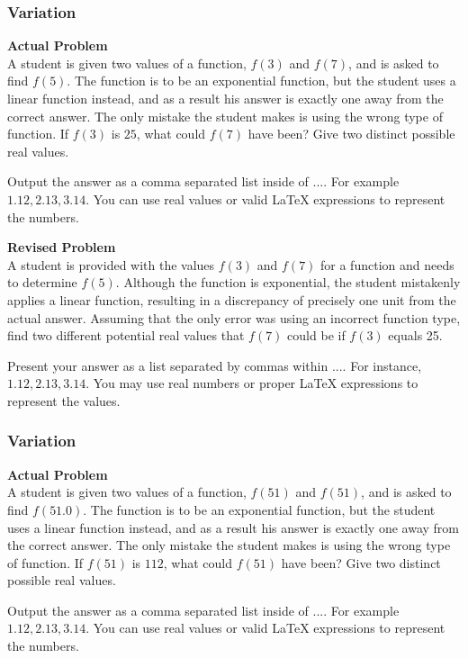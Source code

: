 \subsubsection{Variation}
\textbf{Actual Problem}\\
A student is given two values of a function, $f(3)$ and $f(7)$, and is asked to find $f(5)$. The function is to be an exponential function, but the student uses a linear function instead, and as a result his answer is exactly one away from the correct answer. The only mistake the student makes is using the wrong type of function. If $f(3)$ is $25$, what could $f(7)$ have been? Give two distinct possible real values.

Output the answer as a comma separated list inside of $\boxed{...}$. For example $\boxed{1.12, 2.13, 3.14}$. You can use real values or valid LaTeX expressions to represent the numbers.

\textbf{Revised Problem}\\
A student is provided with the values \( f(3) \) and \( f(7) \) for a function and needs to determine \( f(5) \). Although the function is exponential, the student mistakenly applies a linear function, resulting in a discrepancy of precisely one unit from the actual answer. Assuming that the only error was using an incorrect function type, find two different potential real values that \( f(7) \) could be if \( f(3) \) equals 25.

Present your answer as a list separated by commas within $\boxed{...}$. For instance, $\boxed{1.12, 2.13, 3.14}$. You may use real numbers or proper LaTeX expressions to represent the values.

\subsubsection{Variation}
\textbf{Actual Problem}\\
A student is given two values of a function, $f(51)$ and $f(51)$, and is asked to find $f(51.0)$. The function is to be an exponential function, but the student uses a linear function instead, and as a result his answer is exactly one away from the correct answer. The only mistake the student makes is using the wrong type of function. If $f(51)$ is $112$, what could $f(51)$ have been? Give two distinct possible real values.

Output the answer as a comma separated list inside of $\boxed{...}$. For example $\boxed{1.12, 2.13, 3.14}$. You can use real values or valid LaTeX expressions to represent the numbers.

